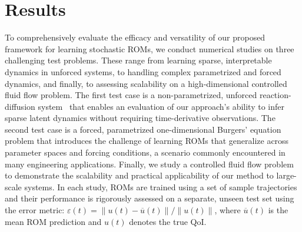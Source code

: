 \documentclass{article}
\begin{document}
	\section{Results} \label{sec:examples}
	
	To comprehensively evaluate the efficacy and versatility of our proposed framework for learning stochastic ROMs, we conduct numerical studies on three challenging test problems.
	These range from learning sparse, interpretable dynamics in unforced systems, to handling complex parametrized and forced dynamics, and finally, to assessing scalability on a high-dimensional controlled fluid flow problem. The first test case is a non-parametrized, unforced reaction-diffusion system~\cite{Champion_2019_Data_Driven_Coordinates} that enables an evaluation of our approach's ability to infer sparse latent dynamics without requiring time-derivative observations. The second test case is a forced, parametrized one-dimensional Burgers' equation problem that introduces the challenge of learning ROMs that generalize across parameter spaces and forcing conditions, a scenario commonly encountered in many engineering applications. Finally, we study a controlled fluid flow problem~\cite{Rabault_2019_Flow_Control_DRL} to demonstrate the scalability and practical applicability of our method to large-scale systems.
	In each study, ROMs are trained using a set of sample trajectories and their performance is rigorously assessed on a separate, unseen test set using the error metric: $\varepsilon(t) = \|{u}(t) - \overline{{u}}(t)\|/\|{u}(t)\|$, where $\overline{{u}}(t)$ is the mean ROM prediction and ${u}(t)$ denotes the true QoI. 
	
\end{document}
